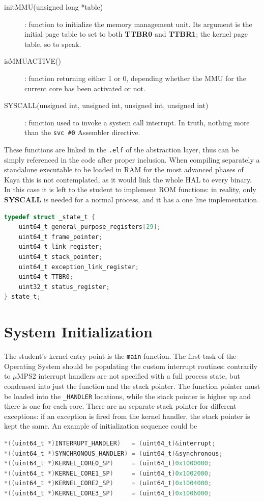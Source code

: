 \documentclass[12pt,a4paper,openright,twoside]{report}
\begin{document}
\begin{description}
    \item[initMMU(unsigned long *table)]: function to initialize the memory 
        management unit. Its argument is the initial page table to set to both
        \textbf{TTBR0} and \textbf{TTBR1}; the kernel page table, so to speak.
    \item[isMMUACTIVE()]: function returning either 1 or 0, depending whether
        the MMU for the current core has been activated or not.
    \item[SYSCALL(unsigned int, unsigned int, unsigned int, unsigned int)]:
    function used to invoke a system call interrupt. In truth, nothing more than
    the {\tt svc \#0} Assembler directive.
\end{description}

These functions are linked in the {\tt .elf} of the abstraction layer, thus can
be simply referenced in the code after proper inclusion. When compiling separately a
standalone executable to be loaded in RAM for the most advanced phases of Kaya
this is not contemplated, as it would link the whole HAL to every binary.
In this case it is left to the student to implement ROM functions: in reality, only
\textbf{SYSCALL} is needed for a normal process, and it has a one line implementation.
\newpage
\begin{lstlisting}[label={lst:state},caption={Process state format},language=C]
typedef struct _state_t {
    uint64_t general_purpose_registers[29];
    uint64_t frame_pointer;
    uint64_t link_register;
    uint64_t stack_pointer;
    uint64_t exception_link_register;
    uint64_t TTBR0;
    uint32_t status_register;
} state_t;
\end{lstlisting}

\section{System Initialization}
The student's kernel entry point is the {\tt main} function. The first task of 
the Operating System should be populating the custom interrupt routines: contrarily 
to $\mu$MPS2 interrupt handlers are not specified with a full process state, but
condensed into just the function and the stack pointer. The function pointer must
be loaded into the {\tt \_HANDLER} locations, while the stack pointer is higher 
up and there is one for each core. There are no separate stack pointer for different
exceptions: if an exception is fired from the kernel handler, the stack pointer
is kept the same.
An example of initialization sequence could be
\begin{lstlisting}[language=C]
*((uint64_t *)INTERRUPT_HANDLER)   = (uint64_t)&interrupt;
*((uint64_t *)SYNCHRONOUS_HANDLER) = (uint64_t)&synchronous;
*((uint64_t *)KERNEL_CORE0_SP)     = (uint64_t)0x1000000;
*((uint64_t *)KERNEL_CORE1_SP)     = (uint64_t)0x1002000;
*((uint64_t *)KERNEL_CORE2_SP)     = (uint64_t)0x1004000;
*((uint64_t *)KERNEL_CORE3_SP)     = (uint64_t)0x1006000;
\end{lstlisting}
\end{document}
